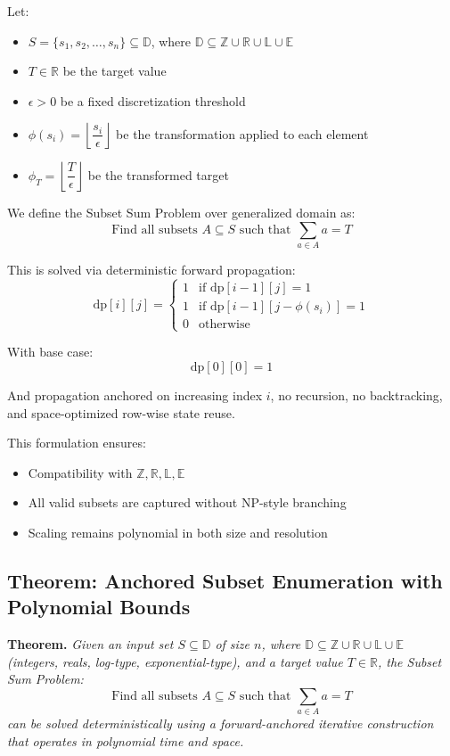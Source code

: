\documentclass[11pt]{article}
\begin{document}
Let:
\begin{itemize}
    \item $S = \{s_1, s_2, \dots, s_n\} \subseteq \mathbb{D}$, where $\mathbb{D} \subseteq \mathbb{Z} \cup \mathbb{R} \cup \mathbb{L} \cup \mathbb{E}$ 
    \item $T \in \mathbb{R}$ be the target value
    \item $\epsilon > 0$ be a fixed discretization threshold
    \item $\phi(s_i) = \left\lfloor \dfrac{s_i}{\epsilon} \right\rfloor$ be the transformation applied to each element
    \item $\phi_T = \left\lfloor \dfrac{T}{\epsilon} \right\rfloor$ be the transformed target
\end{itemize}

We define the Subset Sum Problem over generalized domain as:
\[
\text{Find all subsets } A \subseteq S \text{ such that } \sum_{a \in A} a = T
\]

This is solved via deterministic forward propagation:
\[
\text{dp}[i][j] = 
\begin{cases}
1 & \text{if } \text{dp}[i-1][j] = 1 \\
1 & \text{if } \text{dp}[i-1][j - \phi(s_i)] = 1 \\
0 & \text{otherwise}
\end{cases}
\]

With base case:
\[
\text{dp}[0][0] = 1
\]

And propagation anchored on increasing index $i$, no recursion, no backtracking, and space-optimized row-wise state reuse.

This formulation ensures:
\begin{itemize}
    \item Compatibility with $\mathbb{Z}, \mathbb{R}, \mathbb{L}, \mathbb{E}$
    \item All valid subsets are captured without NP-style branching
    \item Scaling remains polynomial in both size and resolution
\end{itemize}

\vspace{1em}

\subsection*{Theorem: Anchored Subset Enumeration with Polynomial Bounds}

\textbf{Theorem.}
\textit{
Given an input set $S \subseteq \mathbb{D}$ of size $n$, where $\mathbb{D} \subseteq \mathbb{Z} \cup \mathbb{R} \cup \mathbb{L} \cup \mathbb{E}$ (integers, reals, log-type, exponential-type), and a target value $T \in \mathbb{R}$, the Subset Sum Problem:
\[
\text{Find all subsets } A \subseteq S \text{ such that } \sum_{a \in A} a = T
\]
can be solved deterministically using a forward-anchored iterative construction that operates in polynomial time and space.
}
\end{document}
